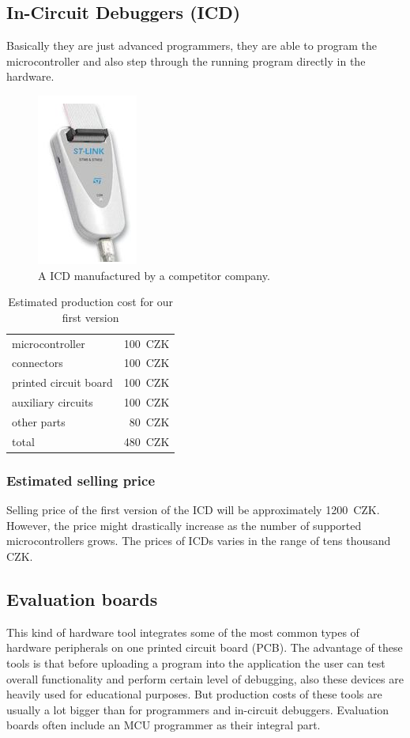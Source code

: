 \documentclass[a4paper,twoside,15pt]{book}
\begin{document}
		\subsection{In-Circuit Debuggers (ICD)}
			Basically they are just advanced programmers, they are able to program the microcontroller and also step through the running program directly in the hardware.

			\begin{figure}[h!]
				\centering{}
				\includegraphics[width=.15\textwidth]{images/debuger.png}
				\caption{A ICD manufactured by a competitor company.}
			\end{figure}

			\begin{table}[h!]
				\begin{tabular}{lr}
					microcontroller			& 100~CZK	\\
					connectors				& 100~CZK	\\
					printed circuit board	& 100~CZK	\\
					auxiliary circuits		& 100~CZK	\\
					other parts				& 80~CZK	\\\hline
					total					& 480~CZK
				\end{tabular}
				\caption{Estimated production cost for our first version}
			\end{table}

			\subsubsection{Estimated selling price}
				Selling price of the first version of the ICD will be approximately 1200~CZK. However, the price might drastically increase as the number of supported microcontrollers grows. The prices of ICDs varies in the range of tens thousand CZK.

		\subsection{Evaluation boards}
			This kind of hardware tool integrates some of the most common types of hardware peripherals on one printed circuit board (PCB). The advantage of these tools is that before uploading a program into the application the user can test overall functionality and perform certain level of debugging, also these devices are heavily used for educational purposes. But production costs of these tools are usually a lot bigger than for programmers and in-circuit debuggers. Evaluation boards often include an MCU programmer as their integral part.
\end{document}
